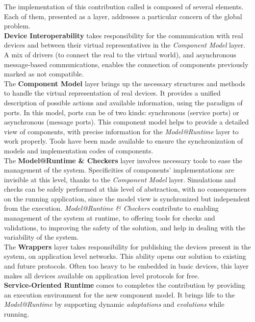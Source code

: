 The implementation of this contribution called \enti{} is composed of several elements. Each of them, presented as a layer, addresses a particular concern of the global problem.\\

{\bf Device Interoperability} takes responsibility for the communication with real devices and between their virtual representatives in the {\it Component Model} layer. A mix of drivers (to connect the real to the virtual world), and asynchronous message-based communications, enables the connection of components previously marked as not compatible.\\

The {\bf Component Model} layer brings up the necessary structures and methods to handle the virtual representation of real devices. It provides a unified description of possible actions and available information, using the paradigm of ports. In this model, ports can be of two kinds: synchronous (service ports) or asynchronous (message ports). This component model helps to provide a detailed view of components, with precise information for the {\it Model@Runtime} layer to work properly. Tools have been made available to ensure the synchronization of models and implementation codes of components.\\

The {\bf Model@Runtime \& Checkers} layer involves necessary tools to ease the management of the system. Specificities of components' implementations are invisible at this level, thanks to the {\it Component Model} layer. Simulations and checks can be safely performed at this level of abstraction, with no consequences on the running application, since the model view is synchronized but independent from the execution. {\it Model@Runtime \& Checkers} contribute to enabling management of the system at runtime, to offering tools for checks and validations, to improving the safety of the solution, and help in dealing with the variability of the system.\\

The {\bf Wrappers} layer takes responsibility for publishing the devices present in the system, on application level networks. This ability opens our solution to existing and future protocols. Often too heavy to be embedded in basic devices, this layer makes all devices available on application level protocols for free.\\

{\bf Service-Oriented Runtime} comes to completes the contribution by providing an execution environment for the new component model. It brings life to the {\it Model@Runtime} by supporting dynamic {\it adaptations} and {\it evolutions} while running.\\


